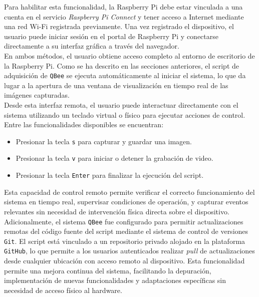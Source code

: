     Para habilitar esta funcionalidad, la Raspberry Pi debe estar vinculada a una cuenta en el servicio \textit{Raspberry Pi Connect} y tener acceso a Internet mediante una red Wi-Fi registrada previamente. Una vez registrado el dispositivo, el usuario puede iniciar sesión en el portal de Raspberry Pi y conectarse directamente a su interfaz gráfica a través del navegador.  \\
    
    
    En ambos métodos, el usuario obtiene acceso completo al entorno de escritorio de la Raspberry Pi. Como se ha descrito en las secciones anteriores, el script de adquisición de \texttt{QBee} se ejecuta automáticamente al iniciar el sistema, lo que da lugar a la apertura de una ventana de visualización en tiempo real de las imágenes capturadas.\\
    
    Desde esta interfaz remota, el usuario puede interactuar directamente con el sistema utilizando un teclado virtual o físico para ejecutar acciones de control. Entre las funcionalidades disponibles se encuentran:
    \begin{itemize}
        \item Presionar la tecla \texttt{s} para capturar y guardar una imagen.
        \item Presionar la tecla \texttt{v} para iniciar o detener la grabación de video.
        \item Presionar la tecla \texttt{Enter} para finalizar la ejecución del script.
    \end{itemize}
    
    Esta capacidad de control remoto permite verificar el correcto funcionamiento del sistema en tiempo real, supervisar condiciones de operación, y capturar eventos relevantes sin necesidad de intervención física directa sobre el dispositivo.\\
    
    
    Adicionalmente, el sistema \texttt{QBee} fue configurado para permitir actualizaciones remotas del código fuente del script mediante el sistema de control de versiones \texttt{Git}. El script está vinculado a un repositorio privado alojado en la plataforma \texttt{GitHub}, lo que permite a los usuarios autenticados realizar \textit{pull} de actualizaciones desde cualquier ubicación con acceso remoto al dispositivo. Esta funcionalidad permite una mejora continua del sistema, facilitando la depuración, implementación de nuevas funcionalidades y adaptaciones específicas sin necesidad de acceso físico al hardware.
    
